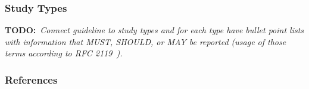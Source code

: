 \documentclass[11pt]{article}
\newcommand{\todo}[1]{{\textbf{TODO:}\ \textit{#1}}} %
\begin{document}
\subsubsection{Study Types}

\todo{Connect guideline to study types and for each type have bullet point lists with information that MUST, SHOULD, or MAY be reported (usage of those terms according to RFC 2119~\cite{rfc2119}).}


\subsubsection{References}



\end{document}
